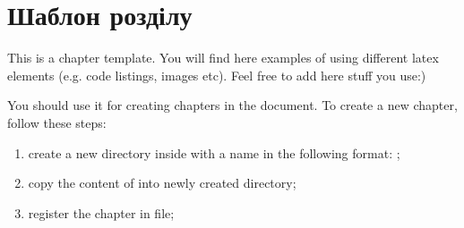 \chapter{Шаблон розділу}
\label{chap:template}


This is a chapter template. You will find here examples of using different
latex elements (e.g. code listings, images etc). Feel free to add here stuff
you use:)

You should use it for creating chapters in the document. To create a new
chapter, follow these steps:

\begin{enumerate}
    \item create a new directory inside  with a name in
        the following format: ;
    \item copy the content of  into newly created directory;
    \item register the chapter in  file;
\end{enumerate}




